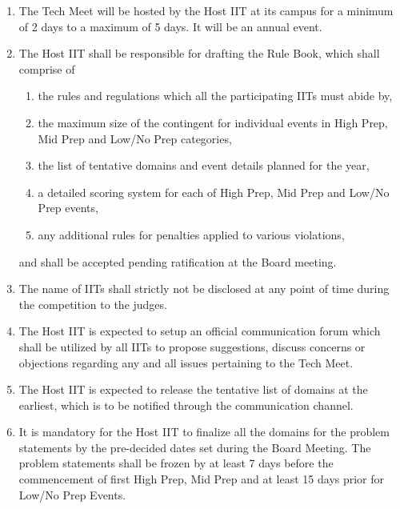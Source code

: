\begin{enumerate}
    \item The Tech Meet will be hosted by the Host IIT at its campus for a minimum of 2 days to a maximum of 5 days. It will be an annual event.
    \item The Host IIT shall be responsible for drafting the Rule Book, which shall comprise of
    \begin{enumerate}
        \item the rules and regulations which all the participating IITs must abide by,
        \item the maximum size of the contingent for individual events in High Prep, Mid Prep and Low/No Prep categories,
        \item the list of tentative domains and event details planned for the year,
        \item a detailed scoring system for each of High Prep, Mid Prep and Low/No Prep events,
        \item any additional rules for penalties applied to various violations,
    \end{enumerate}
    and shall be accepted pending ratification at the Board meeting.
    \item The name of IITs shall strictly not be disclosed at any point of time during the competition to the judges.
    \item The Host IIT is expected to setup an official communication forum which shall be utilized by all IITs to propose suggestions, discuss concerns or objections regarding any and all issues pertaining to the Tech Meet.
    \item The Host IIT is expected to release the tentative list of domains at the earliest, which is to be notified through the communication channel.
    \item It is mandatory for the Host IIT to finalize all the domains for the problem statements by the pre-decided dates set during the Board Meeting. The problem statements shall be frozen by at least 7 days before the commencement of first High Prep, Mid Prep and at least 15 days prior for Low/No Prep Events.
\end{enumerate}

